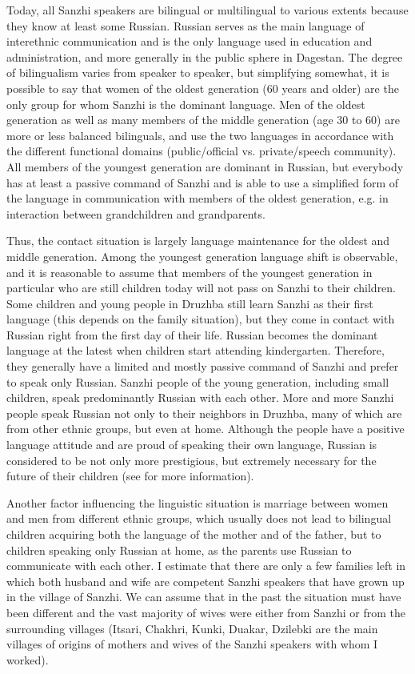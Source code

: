 Today, all Sanzhi speakers are bilingual or multilingual to various extents because they know at least some Russian. Russian serves as the main language of interethnic communication and is the only language used in education and administration, and more generally in the public sphere in Dagestan. The degree of bilingualism varies from speaker to speaker, but simplifying somewhat, it is possible to say that women of the oldest generation (60 years and older) are the only group for whom Sanzhi is the dominant language. Men of the oldest generation as well as many members of the middle generation (age 30 to 60) are more or less balanced bilinguals, and use the two languages in accordance with the different functional domains (public/official vs. private/speech community). All members of the youngest generation are dominant in Russian, but everybody has at least a passive command of Sanzhi and is able to use a simplified form of the language in communication with members of the oldest generation, e.g. in interaction between grandchildren and grandparents.

Thus, the contact situation is largely language maintenance for the oldest and middle generation. Among the youngest generation language shift is observable, and it is reasonable to assume that members of the youngest generation in particular who are still children today will not pass on Sanzhi to their children. Some children and young people in Druzhba still learn Sanzhi as their first language (this depends on the family situation), but they come in contact with Russian right from the first day of their life. Russian becomes the dominant language at the latest when children start attending kindergarten. Therefore, they generally have a limited and mostly passive command of Sanzhi and prefer to speak only Russian. Sanzhi people of the young generation, including small children, speak predominantly Russian with each other. More and more Sanzhi people speak Russian not only to their neighbors in Druzhba, many of which are from other ethnic groups, but even at home. Although the people have a positive language attitude and are proud of speaking their own language, Russian is considered to be not only more prestigious, but extremely necessary for the future of their children (see \citealt{ForkerSubmitteda} for more information).

Another factor influencing the linguistic situation is marriage between women and men from different ethnic groups, which usually does not lead to bilingual children acquiring both the language of the mother and of the father, but to children speaking only Russian at home, as the parents use Russian to communicate with each other. I estimate that there are only a few families left in which both husband and wife are competent Sanzhi speakers that have grown up in the village of Sanzhi. We can assume that in the past the situation must have been different and the vast majority of wives were either from Sanzhi or from the surrounding villages (Itsari, Chakhri, Kunki, Duakar, Dzilebki are the main villages of origins of mothers and wives of the Sanzhi speakers with whom I worked).


